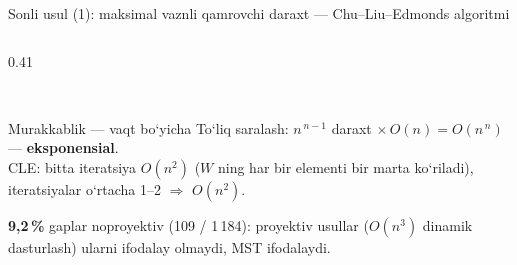 \documentclass[aspectratio=169,11pt]{beamer}
\gdef\yangiliknum{}
\newcommand{\yangilik}[1]{\gdef\yangiliknum{#1}}
\begin{document}
\begin{frame}{Sonli usul (1): maksimal vaznli qamrovchi daraxt --- Chu--Liu--Edmonds algoritmi}
\begin{columns}[T,onlytextwidth]
\begin{column}{0.41\textwidth}
\\[2pt]
  \begin{block}{Murakkablik --- vaqt bo‘yicha}
    \scriptsize To‘liq saralash: $n^{\,n-1}$ daraxt $\times\,O(n)=O(n^{\,n})$ --- \textbf{eksponensial}.\\
    CLE: bitta iteratsiya $O(n^2)$ ($W$ ning har bir elementi bir marta ko‘riladi), iteratsiyalar o‘rtacha 1--2 $\Rightarrow$ \textbf{$O(n^2)$}.
  \end{block}
  \raggedright{\tiny\color{black!65}\textbf{9,2\,\%} gaplar noproyektiv (109 / 1\,184): proyektiv usullar ($O(n^3)$ dinamik dasturlash) ularni ifodalay olmaydi, MST ifodalaydi.\par}
\end{column}
\end{columns}
\yangilik{3}
\end{frame}
\end{document}
